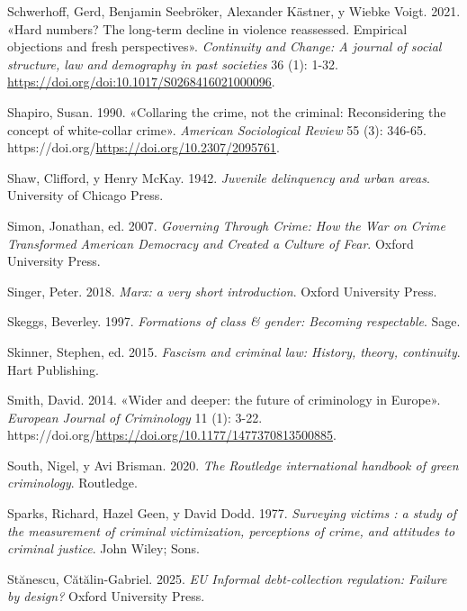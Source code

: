 \documentclass[
  spanish,
  letterpaper,
  DIV=11,
  numbers=noendperiod]{scrreprt}
\newlength{\cslhangindent}
\newenvironment{CSLReferences}[2] %
 {\begin{list}{}{%
  \setlength{\itemindent}{0pt}
  \setlength{\leftmargin}{0pt}
  \setlength{\parsep}{0pt}
  \ifodd #1
   \setlength{\leftmargin}{\cslhangindent}
   \setlength{\itemindent}{-1\cslhangindent}
  \fi
  \setlength{\itemsep}{#2\baselineskip}}}
 {\end{list}}
\begin{document}
\begin{CSLReferences}{1}{0}
Schwerhoff, Gerd, Benjamin Seebröker, Alexander Kästner, y Wiebke Voigt.
2021. {«Hard numbers? The long-term decline in violence reassessed.
Empirical objections and fresh perspectives»}. \emph{Continuity and
Change: A journal of social structure, law and demography in past
societies} 36 (1): 1-32.
\url{https://doi.org/doi:10.1017/S0268416021000096}.

Shapiro, Susan. 1990. {«Collaring the crime, not the criminal:
Reconsidering the concept of white-collar crime»}. \emph{American
Sociological Review} 55 (3): 346-65.
https://doi.org/\url{https://doi.org/10.2307/2095761}.

Shaw, Clifford, y Henry McKay. 1942. \emph{Juvenile delinquency and
urban areas}. University of Chicago Press.

Simon, Jonathan, ed. 2007. \emph{Governing Through Crime: How the War on
Crime Transformed American Democracy and Created a Culture of Fear}.
Oxford University Press.

Singer, Peter. 2018. \emph{Marx: a very short introduction}. Oxford
University Press.

Skeggs, Beverley. 1997. \emph{Formations of class \& gender: Becoming
respectable}. Sage.

Skinner, Stephen, ed. 2015. \emph{Fascism and criminal law: History,
theory, continuity}. Hart Publishing.

Smith, David. 2014. {«Wider and deeper: the future of criminology in
Europe»}. \emph{European Journal of Criminology} 11 (1): 3-22.
https://doi.org/\url{https://doi.org/10.1177/1477370813500885}.

South, Nigel, y Avi Brisman. 2020. \emph{The Routledge international
handbook of green criminology}. Routledge.

Sparks, Richard, Hazel Geen, y David Dodd. 1977. \emph{Surveying victims
: a study of the measurement of criminal victimization, perceptions of
crime, and attitudes to criminal justice}. John Wiley; Sons.

Stănescu, Cătălin-Gabriel. 2025. \emph{EU Informal debt-collection
regulation: Failure by design?} Oxford University Press.


\end{CSLReferences}
\end{document}
